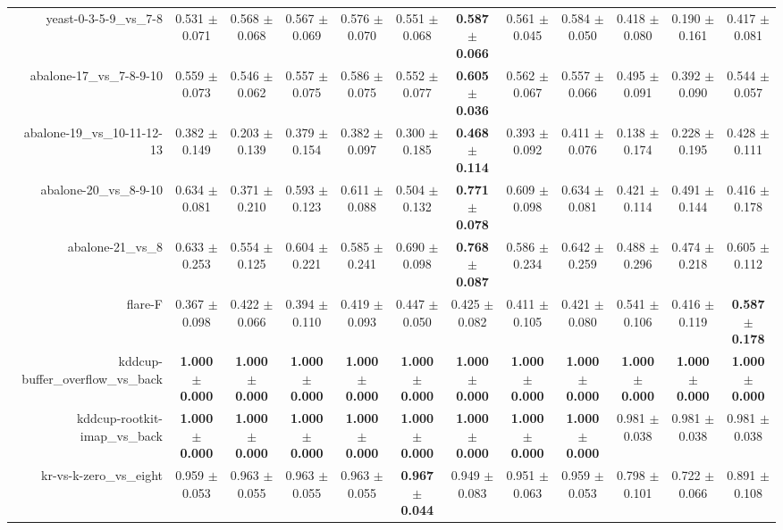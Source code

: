 \begin{table}[!ht]
{\begin{tabular}{r c c c c c c c c c c c}
yeast-0-3-5-9\_vs\_7-8 & 0.531 $\pm$ 0.071 & 0.568 $\pm$ 0.068 & 0.567 $\pm$ 0.069 & 0.576 $\pm$ 0.070 & 0.551 $\pm$ 0.068 & \textbf{0.587 $\pm$ 0.066} & 0.561 $\pm$ 0.045 & 0.584 $\pm$ 0.050 & 0.418 $\pm$ 0.080 & 0.190 $\pm$ 0.161 & 0.417 $\pm$ 0.081 \\
abalone-17\_vs\_7-8-9-10 & 0.559 $\pm$ 0.073 & 0.546 $\pm$ 0.062 & 0.557 $\pm$ 0.075 & 0.586 $\pm$ 0.075 & 0.552 $\pm$ 0.077 & \textbf{0.605 $\pm$ 0.036} & 0.562 $\pm$ 0.067 & 0.557 $\pm$ 0.066 & 0.495 $\pm$ 0.091 & 0.392 $\pm$ 0.090 & 0.544 $\pm$ 0.057 \\
abalone-19\_vs\_10-11-12-13 & 0.382 $\pm$ 0.149 & 0.203 $\pm$ 0.139 & 0.379 $\pm$ 0.154 & 0.382 $\pm$ 0.097 & 0.300 $\pm$ 0.185 & \textbf{0.468 $\pm$ 0.114} & 0.393 $\pm$ 0.092 & 0.411 $\pm$ 0.076 & 0.138 $\pm$ 0.174 & 0.228 $\pm$ 0.195 & 0.428 $\pm$ 0.111 \\
abalone-20\_vs\_8-9-10 & 0.634 $\pm$ 0.081 & 0.371 $\pm$ 0.210 & 0.593 $\pm$ 0.123 & 0.611 $\pm$ 0.088 & 0.504 $\pm$ 0.132 & \textbf{0.771 $\pm$ 0.078} & 0.609 $\pm$ 0.098 & 0.634 $\pm$ 0.081 & 0.421 $\pm$ 0.114 & 0.491 $\pm$ 0.144 & 0.416 $\pm$ 0.178 \\
abalone-21\_vs\_8 & 0.633 $\pm$ 0.253 & 0.554 $\pm$ 0.125 & 0.604 $\pm$ 0.221 & 0.585 $\pm$ 0.241 & 0.690 $\pm$ 0.098 & \textbf{0.768 $\pm$ 0.087} & 0.586 $\pm$ 0.234 & 0.642 $\pm$ 0.259 & 0.488 $\pm$ 0.296 & 0.474 $\pm$ 0.218 & 0.605 $\pm$ 0.112 \\
flare-F & 0.367 $\pm$ 0.098 & 0.422 $\pm$ 0.066 & 0.394 $\pm$ 0.110 & 0.419 $\pm$ 0.093 & 0.447 $\pm$ 0.050 & 0.425 $\pm$ 0.082 & 0.411 $\pm$ 0.105 & 0.421 $\pm$ 0.080 & 0.541 $\pm$ 0.106 & 0.416 $\pm$ 0.119 & \textbf{0.587 $\pm$ 0.178} \\
kddcup-buffer\_overflow\_vs\_back & \textbf{1.000 $\pm$ 0.000} & \textbf{1.000 $\pm$ 0.000} & \textbf{1.000 $\pm$ 0.000} & \textbf{1.000 $\pm$ 0.000} & \textbf{1.000 $\pm$ 0.000} & \textbf{1.000 $\pm$ 0.000} & \textbf{1.000 $\pm$ 0.000} & \textbf{1.000 $\pm$ 0.000} & \textbf{1.000 $\pm$ 0.000} & \textbf{1.000 $\pm$ 0.000} & \textbf{1.000 $\pm$ 0.000} \\
kddcup-rootkit-imap\_vs\_back & \textbf{1.000 $\pm$ 0.000} & \textbf{1.000 $\pm$ 0.000} & \textbf{1.000 $\pm$ 0.000} & \textbf{1.000 $\pm$ 0.000} & \textbf{1.000 $\pm$ 0.000} & \textbf{1.000 $\pm$ 0.000} & \textbf{1.000 $\pm$ 0.000} & \textbf{1.000 $\pm$ 0.000} & 0.981 $\pm$ 0.038 & 0.981 $\pm$ 0.038 & 0.981 $\pm$ 0.038 \\
kr-vs-k-zero\_vs\_eight & 0.959 $\pm$ 0.053 & 0.963 $\pm$ 0.055 & 0.963 $\pm$ 0.055 & 0.963 $\pm$ 0.055 & \textbf{0.967 $\pm$ 0.044} & 0.949 $\pm$ 0.083 & 0.951 $\pm$ 0.063 & 0.959 $\pm$ 0.053 & 0.798 $\pm$ 0.101 & 0.722 $\pm$ 0.066 & 0.891 $\pm$ 0.108 \\

\end{tabular}}
\end{table}
